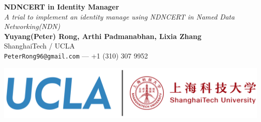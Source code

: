 \documentclass[a0,portrait]{poster}
\begin{document}


\begin{minipage}[b]{0.6\linewidth}
\veryHuge \color{NavyBlue} \textbf{NDNCERT in Identity Manager} \color{Black}\\ %
\Huge\textit{A trial to implement an identity manage using NDNCERT in Named Data Networking(NDN)}\\[2cm] %
\Large \textbf{Yuyang(Peter) Rong, Arthi Padmanabhan, Lixia Zhang \footnotemark}\\[0.5cm] %
\Large ShanghaiTech / UCLA \\ [0.4cm] %
\Large \texttt{PeterRong96@gmail.com} --- +1 (310) 307 9952\\
\end{minipage}
%
\begin{minipage}[b]{0.4\linewidth}
	\includegraphics[width=\linewidth]{figures/logo.png}\\
\end{minipage}

\vspace{0.7cm} %

\end{document}
